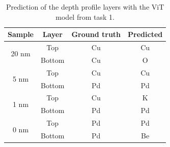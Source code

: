 \begin{table}[H]
    \centering
    \begin{tabular}{c|c|c|c}
        Sample & Layer    & Ground truth & Predicted     \\
                 \hline
\multirow{2}{3em}{20 nm}             &  Top    &       Cu      &       Cu               \\
                                      &  Bottom&        Cu      &       O        \\
                             \hline
\multirow{2}{3em}{5 nm}               &  Top    &       Cu      &       Cu               \\
                                       &  Bottom&        Pd      &       Pd  \\
                             \hline
\multirow{2}{3em}{1 nm}                &  Top    &       Cu      &   K               \\
                                       &  Bottom&        Pd      &   Pd  \\
                             \hline
\multirow{2}{3em}{0 nm}                &  Top    &       Pd      &    Pd               \\
                                       &  Bottom&        Pd      &    Be  \\
    \end{tabular}
    \caption{Prediction of the depth profile layers with the ViT model from task 1.}
    \label{tab:layers_depth}
\end{table}